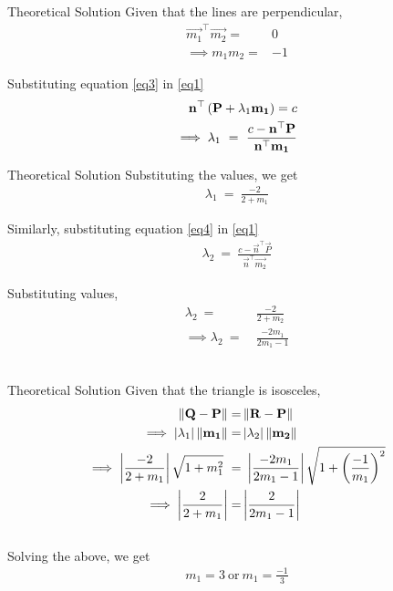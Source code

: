 \documentclass{beamer}
\begin{document}
\begin{frame}{Theoretical Solution}
Given that the lines are perpendicular, 
\begin{align}
    \vec{m_1}^\top\vec{m_2} =& 0\\
    \implies m_1m_2 =& -1
\end{align}

Substituting equation \eqref{eq3} in \eqref{eq1}
\begin{align}
    \vec{n}^\top\brak{\vec{P} + \lambda_1\vec{m_1}} = c\\
    \implies \lambda_1 \ = \ \frac{c-\vec{n}^\top\vec{P}}{\vec{n}^\top\vec{m_1}}
\end{align}

\end{frame}

\begin{frame}{Theoretical Solution}
Substituting the values, we get
\begin{align}
    \lambda_1 \ = \ \frac{-2}{2+m_1}
\end{align}

Similarly, substituting equation \eqref{eq4} in \eqref{eq1}
\begin{align}
    \lambda_2 \ = \ \frac{c-\vec{n}^\top\vec{P}}{\vec{n}^\top\vec{m_2}}
\end{align}

Substituting values,
\begin{align}
    \lambda_2 \ =&\ \frac{-2}{2+m_2}\\
    \implies \lambda_2 \ =& \ \frac{-2m_1}{2m_1-1}
\end{align}\\
\end{frame}

\begin{frame}{Theoretical Solution}
Given that the triangle is isosceles,
\begin{align}
  \norm{\vec{Q}-\vec{P}}=&\norm{\vec{R-P}}\\
  \implies \abs{\lambda_1}\norm{\vec{m_1}} =& \abs{\lambda_2}\norm{\vec{m_2}}\\
  \implies \abs{ \frac{-2}{2+m_1}}\sqrt{1+m_1^2} \ =&\  \abs{\frac{-2m_1}{2m_1-1}}\sqrt{1+\brak{\frac{-1}{m_1}}^2} \\
  \implies  \abs{ \frac{2}{2+m_1}} =& \abs{\frac{2}{2m_1-1}}
\end{align}\\

Solving the above, we get
\begin{align}
    m_1 = 3 \ \text{or} \ m_1 = \frac{-1}{3}
\end{align}

\end{frame}
\end{document}

